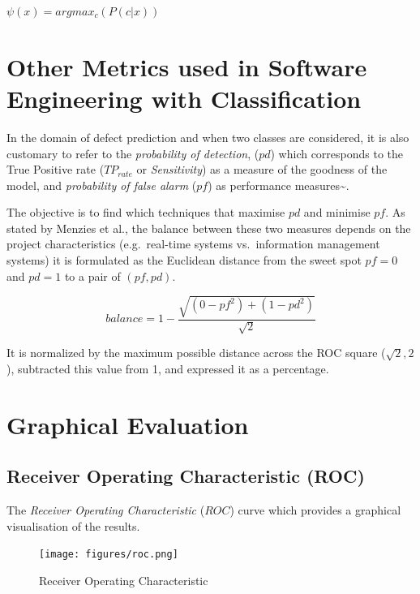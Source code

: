 \documentclass[
]{book}
\begin{document}
\(\psi({x}) = argmax_c (P(c|{x}))\)

\hypertarget{other-metrics-used-in-software-engineering-with-classification}{%
\section{Other Metrics used in Software Engineering with Classification}\label{other-metrics-used-in-software-engineering-with-classification}}

In the domain of defect prediction and when two classes are considered, it is also customary to refer to the \emph{probability of detection}, (\(pd\)) which corresponds to the True Positive rate (\(TP_{rate}\) or \emph{Sensitivity}) as a measure of the goodness of the model, and \emph{probability of false alarm} (\(pf\)) as performance measures\textasciitilde{}\cite{Menzies07}.

The objective is to find which techniques that maximise \(pd\) and minimise \(pf\). As stated by Menzies et al., the balance between these two measures depends on the project characteristics (e.g.~real-time systems vs.~information management systems) it is formulated as the Euclidean distance from the sweet spot \(pf=0\) and \(pd=1\) to a pair of \((pf,pd)\).

\[balance=1-\frac{\sqrt{(0-pf^2)+(1-pd^2)}}{\sqrt{2}}\]

It is normalized by the maximum possible distance across the ROC square (\(\sqrt{2}, 2\)), subtracted this value from 1, and expressed it as a percentage.

\hypertarget{graphical-evaluation}{%
\section{Graphical Evaluation}\label{graphical-evaluation}}

\hypertarget{receiver-operating-characteristic-roc}{%
\subsection{Receiver Operating Characteristic (ROC)}\label{receiver-operating-characteristic-roc}}

The \emph{Receiver Operating Characteristic} (\(ROC\))\citep{Fawcett2006} curve which provides a graphical visualisation of the results.

\begin{figure}
\centering
\texttt{[image: figures/roc.png]}
\caption{Receiver Operating Characteristic}
\end{figure}
\end{document}
